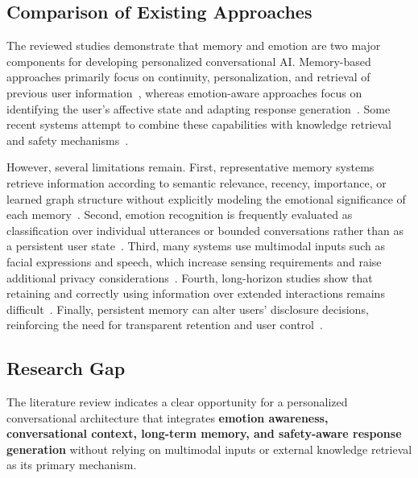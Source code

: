 \documentclass[graybox]{svmult}
\begin{document}
\subsection{Comparison of Existing Approaches}

The reviewed studies demonstrate that memory and emotion are two major components for developing personalized conversational AI. Memory-based approaches primarily focus on continuity, personalization, and retrieval of previous user information~\cite{zhong2024memorybank,packer2023memgpt,park2023generative}, whereas emotion-aware approaches focus on identifying the user's affective state and adapting response generation~\cite{rashkin2019empathetic,liu2021esconv,majumder2019dialoguernn}. Some recent systems attempt to combine these capabilities with knowledge retrieval and safety mechanisms~\cite{Raghav2026,Jover2026}.

However, several limitations remain. First, representative memory systems retrieve information according to semantic relevance, recency, importance, or learned graph structure without explicitly modeling the emotional significance of each memory~\cite{park2023generative,zhong2024memorybank,edge2024graphrag,gutierrez2024hipporag}. Second, emotion recognition is frequently evaluated as classification over individual utterances or bounded conversations rather than as a persistent user state~\cite{demszky2020goemotions,majumder2019dialoguernn,ghosal2020cosmic}. Third, many systems use multimodal inputs such as facial expressions and speech, which increase sensing requirements and raise additional privacy considerations~\cite{Abinaya2025,Devi2026,poria2019meld}. Fourth, long-horizon studies show that retaining and correctly using information over extended interactions remains difficult~\cite{wu2025longmemeval,maharana2024longterm}. Finally, persistent memory can alter users' disclosure decisions, reinforcing the need for transparent retention and user control~\cite{Cox2026,chhikara2025mem0}.

\subsection{Research Gap}

The literature review indicates a clear opportunity for a personalized conversational architecture that integrates \textbf{emotion awareness, conversational context, long-term memory, and safety-aware response generation} without relying on multimodal inputs or external knowledge retrieval as its primary mechanism.
\end{document}
